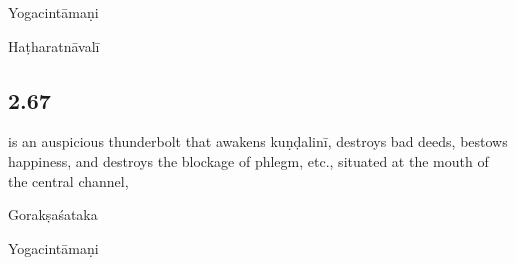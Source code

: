 \begin{ekdosis}
\begin{testimonia}[hp02_066]
Yogacintāmaṇi

\begin{versinnote}
\end{versinnote}

Haṭharatnāvalī

\begin{versinnote}
\end{versinnote}
\end{testimonia}

\begin{philcomm}[hp02_066]
\end{philcomm}

\subsection*{2.67}
\begin{translation}[hp02_067]
is an auspicious thunderbolt that awakens kuṇḍalinī, destroys bad deeds, bestows happiness, and destroys the blockage of phlegm, etc., situated at the mouth of the central channel,
\end{translation}

\begin{sources}[hp02_067]
Gorakṣaśataka

\begin{versinnote}
\end{versinnote}
\end{sources}

\begin{testimonia}[hp02_067]
Yogacintāmaṇi

\begin{versinnote}
\end{versinnote}


\end{testimonia}
\end{ekdosis}
